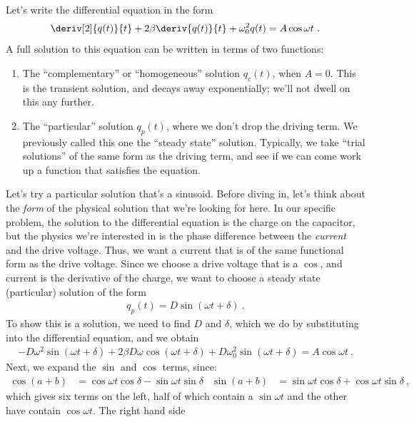\documentclass[12pt]{article}
\begin{document}
Let's write the differential equation in the form
\begin{gather*}
  \deriv[2]{q(t)}{t} + 2 \beta \deriv{q(t)}{t} + \omega_0^2 q(t) = A
  \cos\omega t\ .
\end{gather*}
A full solution to this equation can be written in terms of two
functions: 
 \begin{enumerate}
\item The ``complementary'' or ``homogeneous'' solution $q_c(t)$, when
  $A=0$.  This is the transient solution, and decays away
  exponentially; we'll not dwell on this any further.
\item The ``particular'' solution $q_p(t)$, where we don't drop the
  driving term.  We previously called this one the ``steady state''
  solution.  Typically, we take ``trial solutions'' of the same form
  as the driving term, and see if we can come work up a function that
  satisfies the equation.
\end{enumerate}
Let's try a particular solution that's a sinusoid.  Before diving in,
let's think about the \textit{form} of the physical solution that
we're looking for here.  In our specific problem, the solution to the
differential equation is the charge on the capacitor, but the physics
we're interested in is the phase difference between the
\textit{current} and the drive voltage.  Thus, we want a current that
is of the same functional form as the drive voltage.  Since we choose
a drive voltage that is a $\cos$, and current is the derivative of the
charge, we want to choose a steady state (particular) solution of the
form
\begin{gather*}
  q_p(t) = D \sin\left( \omega t + \delta \right)\ .
\end{gather*}
To show this is a solution, we need to find $D$ and $\delta$, which we
do by substituting into the differential equation, and we obtain
\begin{gather*}
  -D\omega^2 \sin\left(\omega t + \delta\right) + 2\beta D\omega
  \cos\left(\omega t + \delta\right) + D\omega_0^2 \sin\left(\omega t
    + \delta\right) = A \cos\omega t\ .
\end{gather*}
Next, we expand the $\sin$ and $\cos$ terms, since:
\begin{align*}
  \cos(a+b) &= \cos\omega t \cos\delta - \sin\omega t \sin\delta &
  \sin(a+b) &= \sin\omega t \cos\delta + \cos\omega t \sin\delta\ ,
\end{align*}
which gives six terms on the left, half of which contain a $\sin\omega
t$ and the other have contain $\cos\omega t$.  The right hand side
\end{document}
